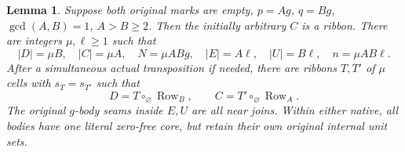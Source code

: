 \documentclass[11pt,a4paper]{amsart}
\numberwithin{equation}{section}
\theoremstyle{plain}
\newtheorem{lemma}[theorem]{Lemma}
\theoremstyle{definition}
\newcommand{\Row}{\operatorname{Row}}
\begin{document}
\begin{lemma}\label{lem:empty-seams}
Suppose both original marks are empty, \(p=Ag\), \(q=Bg\),
\(\gcd(A,B)=1\), \(A>B\ge2\).  Then the initially arbitrary \(C\) is a ribbon.
There are integers \(\mu,\ell\ge1\) such that
\[
 |D|=\mu B,\quad |C|=\mu A,\quad N=\mu ABg,
 \quad |E|=A\ell,\quad |U|=B\ell,\quad n=\mu AB\ell.
\]
After a simultaneous actual transposition if needed, there are ribbons
\(T,T'\) of \(\mu\) cells with \(s_T=s_{T'}\) such that
\begin{equation}\label{eq:empty-outer-factors}
 D=T\circ_\varnothing\Row_B,\qquad
 C=T'\circ_\varnothing\Row_A.
\end{equation}
The original \(g\)-body seams inside \(E,U\) are all near joins.  Within either
native, all bodies have one literal zero-free core, but retain their own
original internal unit sets.
\end{lemma}
\end{document}
